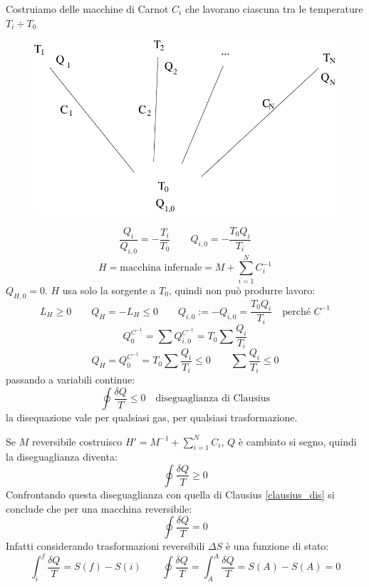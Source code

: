 Costruiamo delle macchine di Carnot $C_i$ che lavorano ciascuna tra le temperature $T_i\div T_0$
\begin{figure}[htbp]
\centering
\includegraphics[scale=0.5]{immagini/fisica1/hell_machine}
\end{figure}

$$\frac{Q_i}{Q_{i,0}}=-\frac{T_i}{T_0}\qquad Q_{i,0}=-\frac{T_0Q_i}{T_i}$$
$$H=\text{macchina infernale}=M+\sum_{i=1}^{N}C_i^{-1}$$
$Q_{H,0}=0$. $H$ usa solo la sorgente a $T_0$, quindi non può produrre lavoro:
$$L_H\geq0\qquad Q_H=-L_H\leq 0\qquad Q_{i,0}:=-Q_{i,0}=\frac{T_0Q_i}{T_i}\quad\text{perché $C^{-1}$}$$
$$Q_0^{C^{-1}}=\sum Q_{i,0}^{C^{-1}}=T_0\sum\frac{Q_i}{T_i}$$
$$Q_H=Q_0^{C^{-1}}=T_0\sum\frac{Q_i}{T_i}\leq 0\qquad \sum\frac{Q_i}{T_i}\leq 0$$
passando a variabili continue:
\begin{equation}
\oint\frac{\delta Q}{T}\leq 0\quad\text{diseguaglianza di Clausius}
\label{clausius_dis}
\end{equation}
la disequazione vale per qualsiasi gas, per qualsiasi trasformazione.

Se $M$ reversibile costruisco $H'=M^{-1}+\sum_{i=1}^N C_i$, $Q$ è cambiato si segno, quindi la diseguaglianza diventa:
$$\oint\frac{\delta Q}{T}\geq0$$
Confrontando questa diseguaglianza con quella di Clausius \eqref{clausius_dis} si conclude che per una macchina reversibile:
\begin{equation}
\oint\frac{\delta Q}{T}=0
\end{equation}
Infatti considerando trasformazioni reversibili $\Delta S$ è una funzione di stato:
$$\int_i^f\frac{\delta Q}{T}=S(f)-S(i)\qquad\oint\frac{\delta Q}{T}=\int_A^A\frac{\delta Q}{T}=S(A)-S(A)=0$$

